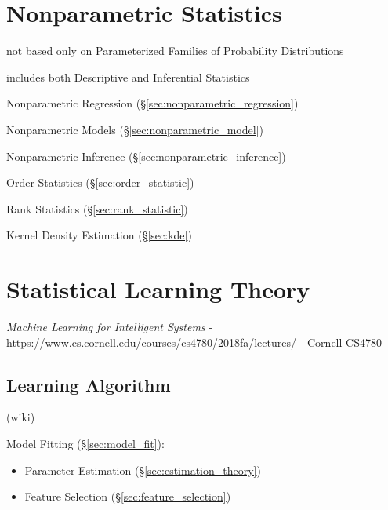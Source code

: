 \section{Nonparametric Statistics}\label{sec:nonparametric_statistics}

not based only on Parameterized Families of Probability Distributions

includes both Descriptive and Inferential Statistics

Nonparametric Regression (\S\ref{sec:nonparametric_regression})

Nonparametric Models (\S\ref{sec:nonparametric_model})

Nonparametric Inference (\S\ref{sec:nonparametric_inference})

Order Statistics (\S\ref{sec:order_statistic})

Rank Statistics (\S\ref{sec:rank_statistic})

Kernel Density Estimation (\S\ref{sec:kde})



\section{Statistical Learning Theory}\label{sec:statistical_learning_theory}

\emph{Machine Learning for Intelligent Systems} -
\url{https://www.cs.cornell.edu/courses/cs4780/2018fa/lectures/} -
Cornell CS4780



\subsection{Learning Algorithm}\label{sec:learning_algorithm}

(wiki)

Model Fitting (\S\ref{sec:model_fit}):
\begin{itemize}
  \item Parameter Estimation (\S\ref{sec:estimation_theory})
  \item Feature Selection (\S\ref{sec:feature_selection})
\end{itemize}

